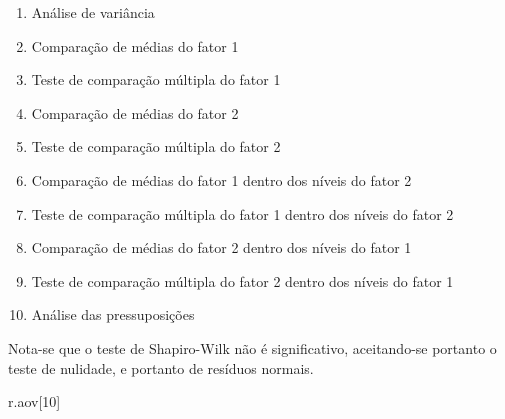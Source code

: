 \documentclass[
]{article}
\newenvironment{Shaded}{\begin{snugshade}}{\end{snugshade}}
\newcommand{\DecValTok}[1]{\textcolor[rgb]{0.00,0.00,0.81}{#1}}
\newcommand{\NormalTok}[1]{#1}
\providecommand{\tightlist}{%
  \setlength{\itemsep}{0pt}\setlength{\parskip}{0pt}}
\begin{document}
\begin{enumerate}
\def\labelenumi{\arabic{enumi}.}
\tightlist
\item
  Análise de variância
\item
  Comparação de médias do fator 1
\item
  Teste de comparação múltipla do fator 1
\item
  Comparação de médias do fator 2
\item
  Teste de comparação múltipla do fator 2
\item
  Comparação de médias do fator 1 dentro dos níveis do fator 2
\item
  Teste de comparação múltipla do fator 1 dentro dos níveis do fator 2
\item
  Comparação de médias do fator 2 dentro dos níveis do fator 1
\item
  Teste de comparação múltipla do fator 2 dentro dos níveis do fator 1
\item
  Análise das pressuposições
\end{enumerate}

Nota-se que o teste de Shapiro-Wilk não é significativo, aceitando-se portanto o teste de nulidade, e portanto de resíduos normais.

\begin{Shaded}
\begin{Highlighting}[]
\NormalTok{r.aov[}\DecValTok{10}\NormalTok{]}
\end{Highlighting}
\end{Shaded}
\end{document}
